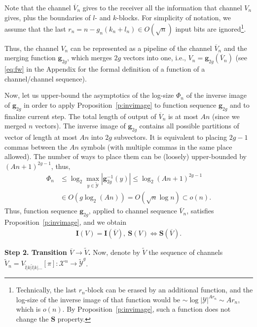 \documentclass[journal, twocol]{IEEEtran}
\newcommand{\tl}{{\widetilde{l}}}
\newcommand{\bfI}{{\mathbf{I}}}
\newcommand{\bfS}{{\mathbf{S}}}
\newcommand{\oV}{{\overline{V}}}
\newcommand{\tV}{{\widetilde{V}}}
\newcommand{\mX}{{\mathcal{X}}}
\newcommand{\mY}{{\mathcal{Y}}}
\newcommand{\tmY}{{\widetilde{\mY}}}
\newcommand{\abs}[1]{\left|{#1}\right|}
\newcommand{\bg}{\mathbf{g}}
\begin{document}
Note that the channel $\oV_n$ gives to the receiver all the information that channel $V_n$ gives, plus the boundaries of $l$- and $k$-blocks.
For simplicity of notation, we assume that the last $r_n=n-g_n(k_n+l_n) \in O(\sqrt{n})$ input bits are ignored\footnote{Technically, the last $r_n$-block can be erased by an additional function, and the log-size of the inverse image of that function would be $\sim \log |\mY|^{Ar_n}\sim Ar_n$, which is $o(n)$. 
By Proposition~\ref{p:invimage}, such a function does not change the $\bfS$ property.}.

Thus, the channel $V_n$ can be represented as a pipeline of the channel $\oV_n$ and the merging function $\bg_{2g}$, which merges $2g$ vectors into one, i.e., $V_n=\bg_{2g}(\oV_n)$ (see \eqref{eq:fw} in the Appendix for the formal definition of a function of a channel/channel sequence).

Now, let us upper-bound the asymptotics of the log-size $\Phi_n$ of the inverse image of $\bg_{2g}$ in order to apply Proposition~\ref{p:invimage} to function sequence $\bg_{2g}$ and to finalize current step.
The total length of output of $\oV_n$ is at most $An$ (since we merged $n$ vectors).
The inverse image of $\bg_{2g}$ contains all possible partitions of vector of length at most $An$ into $2g$ subvectors.
It is equivalent to placing $2g-1$ commas between the $An$ symbols (with multiple commas in the same place allowed). The number of ways to place them can be (loosely) upper-bounded by $(An+1)^{2g-1}$, thus,
\begin{align}
\Phi_n&\leq\log_2\max_{y\in\tmY}\abs{\bg_{2g}^{-1}(y)}\leq \log_2(An+1)^{2g-1} 
\nonumber\\&
\in O(g\log_2 (An)) = O(\sqrt{n}\log n)\subset o(n).
\label{eq:Phinasy}
\end{align}
Thus, function sequence $\bg_{2g}$, applied to channel sequence $\oV_n$, satisfies Proposition~\ref{p:invimage}, and we obtain
\begin{align}
\bfI(V)=\bfI(\oV),~\bfS(V)\iff\bfS(\oV).
\label{eq:V-oV}
\end{align}

\textbf{Step 2. Transition $\oV\to\tV$.}
Now, denote by $\tV$ the sequence of channels $\tV_n=V_{\tl|k|\tl|k|\dots}[\pi]:\mX^n\to\tmY^g$.
\end{document}
